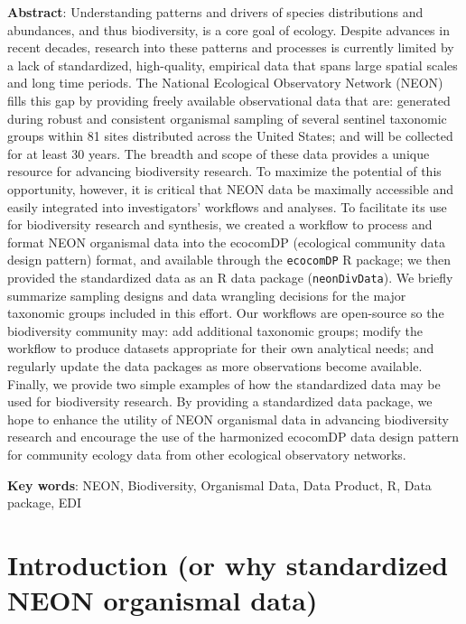 \documentclass[
  12pt,
]{article}
\begin{document}
\textbf{Abstract}: Understanding patterns and drivers of species distributions and abundances, and thus biodiversity, is a core goal of ecology. Despite advances in recent decades, research into these patterns and processes is currently limited by a lack of standardized, high-quality, empirical data that spans large spatial scales and long time periods. The National Ecological Observatory Network (NEON) fills this gap by providing freely available observational data that are: generated during robust and consistent organismal sampling of several sentinel taxonomic groups within 81 sites distributed across the United States; and will be collected for at least 30 years. The breadth and scope of these data provides a unique resource for advancing biodiversity research. To maximize the potential of this opportunity, however, it is critical that NEON data be maximally accessible and easily integrated into investigators' workflows and analyses. To facilitate its use for biodiversity research and synthesis, we created a workflow to process and format NEON organismal data into the ecocomDP (ecological community data design pattern) format, and available through the \texttt{ecocomDP} R package; we then provided the standardized data as an R data package (\texttt{neonDivData}). We briefly summarize sampling designs and data wrangling decisions for the major taxonomic groups included in this effort. Our workflows are open-source so the biodiversity community may: add additional taxonomic groups; modify the workflow to produce datasets appropriate for their own analytical needs; and regularly update the data packages as more observations become available. Finally, we provide two simple examples of how the standardized data may be used for biodiversity research. By providing a standardized data package, we hope to enhance the utility of NEON organismal data in advancing biodiversity research and encourage the use of the harmonized ecocomDP data design pattern for community ecology data from other ecological observatory networks.

\textbf{Key words}: NEON, Biodiversity, Organismal Data, Data Product, R, Data package, EDI

\hypertarget{introduction-or-why-standardized-neon-organismal-data}{%
\section{Introduction (or why standardized NEON organismal data)}\label{introduction-or-why-standardized-neon-organismal-data}}
\end{document}
